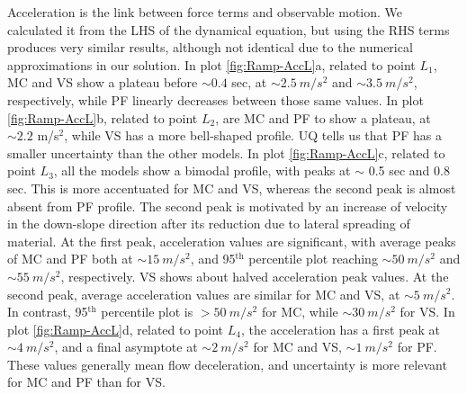 \documentclass{article}
\begin{document}
Acceleration is the link between force terms and observable motion. We calculated it from the LHS of the dynamical equation, but using the RHS terms produces very similar results, although not identical due to the numerical approximations in our solution. In plot \ref{fig:Ramp-AccL}a, related to point $L_1$, MC and VS show a plateau before $\sim 0.4$ sec, at $\sim 2.5 \ m/s^2$ and $\sim 3.5 \ m/s^2$, respectively, while PF linearly decreases between those same values. In plot \ref{fig:Ramp-AccL}b, related to point $L_2$, are MC and PF to show a plateau, at $\sim 2.2$ m/s$^2$, while VS has a more bell-shaped profile. UQ tells us that PF has a smaller uncertainty than the other models. In plot \ref{fig:Ramp-AccL}c, related to point $L_3$, all the models show a bimodal profile, with peaks at $\sim$ 0.5 sec and 0.8 sec. This is more accentuated for MC and VS, whereas the second peak is almost absent from PF profile. The second peak is motivated by an increase of velocity in the down-slope direction after its reduction due to lateral spreading of material. At the first peak, acceleration values are significant, with average peaks of MC and PF both at $\sim 15 \ m/s^2$, and 95$^{\mathrm{th}}$ percentile plot reaching $\sim 50 \ m/s^2$ and $\sim 55 \ m/s^2$, respectively. VS shows about halved acceleration peak values. At the second peak, average acceleration values are similar for MC and VS, at $\sim 5 \ m/s^2$. In contrast, 95$^{\mathrm{th}}$ percentile plot is $> 50 \ m/s^2$ for MC, while $\sim 30 \ m/s^2$ for VS. In plot \ref{fig:Ramp-AccL}d, related to point $L_4$, the acceleration has a first peak at $\sim 4 \ m/s^2$, and a final asymptote at $\sim 2 \ m/s^2$ for MC and VS, $\sim 1 \ m/s^2$ for PF. These values generally mean flow deceleration, and uncertainty is more relevant for MC and PF than for VS.
\end{document}
